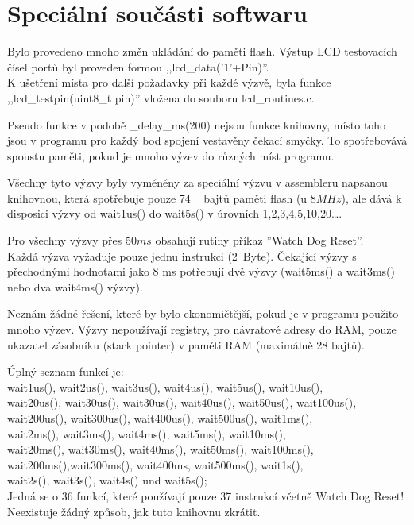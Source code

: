 \chapter{Speciální součásti softwaru}
Bylo provedeno mnoho změn ukládání do paměti flash.
Výstup LCD testovacích čísel portů byl proveden formou ,,lcd\_data('1'+Pin)''.
\\K ušetření místa pro další požadavky při každé výzvě, byla funkce ,,lcd\_testpin(uint8\_t pin)'' vložena do souboru lcd\_routines.c.

Pseudo funkce v podobě \_delay\_ms(200) nejsou funkce knihovny,
místo toho jsou v programu pro každý bod spojení vestavěny čekací smyčky.
To spotřebovává spoustu paměti, pokud je mnoho výzev do různých míst programu.

Všechny tyto výzvy byly vyměněny za speciální výzvu v assembleru napsanou knihovnou,
která spotřebuje pouze 74 ~ bajtů paměti flash (u \(8MHz\)),  ale
dává k disposici výzvy od wait1us() do wait5s() v úrovních 1,2,3,4,5,10,20\dots.

Pro všechny výzvy přes \(50ms\) obsahují rutiny příkaz ''Watch Dog Reset''.
\\Každá výzva vyžaduje pouze jednu instrukci (2~Byte). Čekající výzvy s přechodnými hodnotami
jako 8 ms potřebují dvě výzvy (wait5ms() a wait3ms() nebo dva wait4ms() výzvy).

Neznám žádné řešení, které by bylo ekonomičtější, pokud je v programu použito mnoho výzev.
Výzvy nepoužívají registry, pro návratové adresy do RAM, pouze ukazatel zásobníku (stack pointer)
v paměti RAM (maximálně 28 bajtů).

Úplný seznam funkcí je:\\
wait1us(), wait2us(), wait3us(), wait4us(), wait5us(), wait10us(), \\
wait20us(), wait30us(), wait30us(), wait40us(), wait50us(), wait100us(), \\
wait200us(), wait300us(), wait400us(), wait500us(), wait1ms(),\\
wait2ms(), wait3ms(), wait4ms(), wait5ms(), wait10ms(),\\
wait20ms(), wait30ms(), wait40ms(), wait50ms(), wait100ms(),\\
wait200ms(),wait300ms(), wait400ms, wait500ms(), wait1s(),\\
wait2s(), wait3s(), wait4s() und wait5s();\\

Jedná se o 36 funkcí, které používají pouze 37 instrukcí včetně Watch Dog Reset!
\\Neexistuje žádný způsob, jak tuto knihovnu zkrátit.\\

